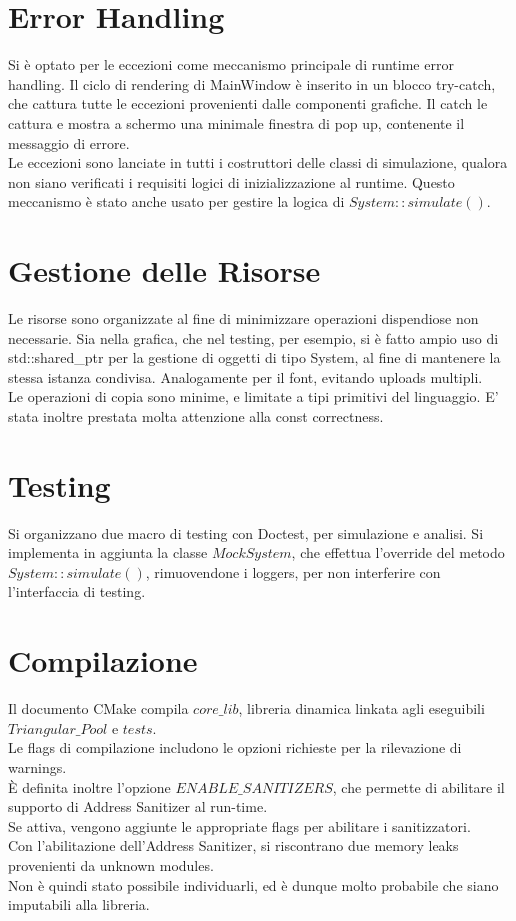 \documentclass{article}
\begin{document}
\section{Error Handling}
Si è optato per le eccezioni come meccanismo principale di runtime error handling.
Il ciclo di rendering di MainWindow è inserito in un blocco try-catch, che cattura tutte le eccezioni provenienti dalle componenti grafiche. Il catch le cattura e mostra a schermo una minimale finestra di pop up, contenente il messaggio di errore.\\
Le eccezioni sono lanciate in tutti i costruttori delle classi di simulazione, qualora non siano verificati i requisiti logici di inizializzazione al runtime.
Questo meccanismo è stato anche usato per gestire la logica di $System::simulate()$.


\section{Gestione delle Risorse}
Le risorse sono organizzate al fine di minimizzare operazioni dispendiose non necessarie.
Sia nella grafica, che nel testing, per esempio, si è fatto ampio uso di std::shared\_ptr per la gestione di oggetti di tipo System, al fine di mantenere la stessa istanza condivisa.
Analogamente per il font, evitando uploads multipli.\\
Le operazioni di copia sono minime, e limitate a tipi primitivi del linguaggio.
E' stata inoltre prestata molta attenzione alla const correctness.


\section{Testing}
Si organizzano due macro di testing con Doctest, per simulazione e analisi.
Si implementa in aggiunta la classe $MockSystem$, che effettua l'override del metodo $System::simulate()$, rimuovendone i loggers, per non interferire con l'interfaccia di testing.

\section{Compilazione}
Il documento CMake compila $core\_lib$, libreria dinamica linkata agli eseguibili $Triangular\_Pool$ e $tests$.\\
Le flags di compilazione includono le opzioni richieste per la rilevazione di warnings.\\
È definita inoltre l'opzione $ENABLE\_SANITIZERS$, che permette di abilitare il supporto di Address Sanitizer al run-time.\\
Se attiva, vengono aggiunte le appropriate flags per abilitare i sanitizzatori. \\
Con l'abilitazione dell'Address Sanitizer, si riscontrano due memory leaks provenienti da unknown modules. \\ Non è quindi stato possibile individuarli, ed è dunque molto probabile che siano imputabili alla libreria.
\end{document}
